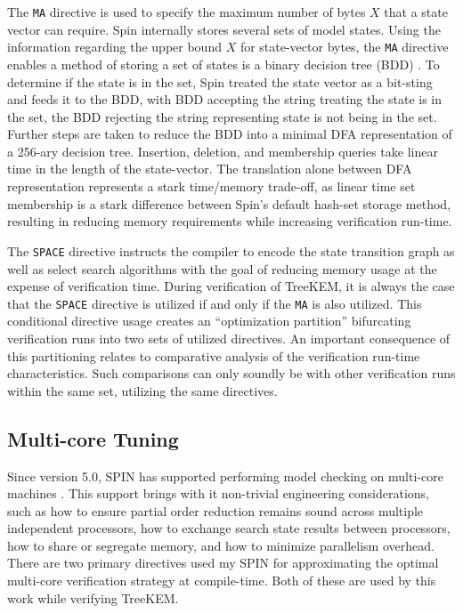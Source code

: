 The \texttt{MA} directive is used to specify the maximum number of bytes \(X\) that a state vector can require.
Spin internally stores several sets of model states.
Using the information regarding the upper bound \(X\) for state-vector bytes, the \texttt{MA} directive enables a method of storing a set of states is a binary decision tree (BDD) \autocite{holzmann1999minimized}.
To determine if the state is in the set, Spin treated the state vector as a bit-sting and feeds it to the BDD, with BDD accepting the string treating the state is in the set, the BDD rejecting the string representing state is not being in the set.
Further steps are taken to reduce the BDD into a minimal DFA representation of a 256-ary decision tree.
Insertion, deletion, and membership queries take linear time in the length of the state-vector.
The translation alone between DFA representation represents a stark time/memory trade-off, as linear time set membership is a stark difference between Spin's default hash-set storage method, resulting in reducing memory requirements while increasing verification run-time.

The \texttt{SPACE} directive instructs the compiler to encode the state transition graph as well as select search algorithms with the goal of reducing memory usage at the expense of verification time.
During verification of TreeKEM, it is always the case that the \texttt{SPACE} directive is utilized if and only if the \texttt{MA} is also utilized.
This conditional directive usage creates an ``optimization partition'' bifurcating verification runs into two sets of utilized directives.
An important consequence of this partitioning relates to comparative analysis of the verification run-time characteristics.
Such comparisons can only soundly be with other verification runs within the same set, utilizing the same directives.

\hypertarget{multi-core-tuning}{%
\subsection{Multi-core Tuning}\label{multi-core-tuning}}

Since version 5.0, SPIN has supported performing model checking on multi-core machines \autocite{holzmann2007design}.
This support brings with it non-trivial engineering considerations, such as how to ensure partial order reduction remains sound across multiple independent processors, how to exchange search state results between processors, how to share or segregate memory, and how to minimize parallelism overhead.
There are two primary directives used my SPIN for approximating the optimal multi-core verification strategy at compile-time.
Both of these are used by this work while verifying TreeKEM.

